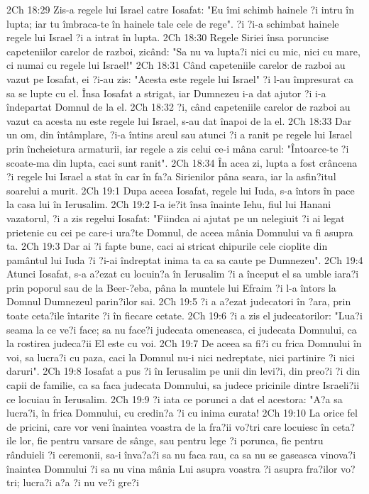 2Ch 18:29  Zis-a regele lui Israel catre Iosafat: "Eu îmi schimb hainele ?i intru în lupta; iar tu îmbraca-te în hainele tale cele de rege". ?i ?i-a schimbat hainele regele lui Israel ?i a intrat în lupta.
2Ch 18:30  Regele Siriei însa poruncise capeteniilor carelor de razboi, zicând: "Sa nu va lupta?i nici cu mic, nici cu mare, ci numai cu regele lui Israel!"
2Ch 18:31  Când capeteniile carelor de razboi au vazut pe Iosafat, ei ?i-au zis: "Acesta este regele lui Israel" ?i l-au împresurat ca sa se lupte cu el. Însa Iosafat a strigat, iar Dumnezeu i-a dat ajutor ?i i-a îndepartat Domnul de la el.
2Ch 18:32  ?i, când capeteniile carelor de razboi au vazut ca acesta nu este regele lui Israel, s-au dat înapoi de la el.
2Ch 18:33  Dar un om, din întâmplare, ?i-a întins arcul sau atunci ?i a ranit pe regele lui Israel prin încheietura armaturii, iar regele a zis celui ce-i mâna carul: "Întoarce-te ?i scoate-ma din lupta, caci sunt ranit".
2Ch 18:34  În acea zi, lupta a fost crâncena ?i regele lui Israel a stat în car în fa?a Sirienilor pâna seara, iar la asfin?itul soarelui a murit.
2Ch 19:1  Dupa aceea Iosafat, regele lui Iuda, s-a întors în pace la casa lui în Ierusalim.
2Ch 19:2  I-a ie?it însa înainte Iehu, fiul lui Hanani vazatorul, ?i a zis regelui Iosafat: "Fiindca ai ajutat pe un nelegiuit ?i ai legat prietenie cu cei pe care-i ura?te Domnul, de aceea mânia Domnului va fi asupra ta.
2Ch 19:3  Dar ai ?i fapte bune, caci ai stricat chipurile cele cioplite din pamântul lui Iuda ?i ?i-ai îndreptat inima ta ca sa caute pe Dumnezeu".
2Ch 19:4  Atunci Iosafat, s-a a?ezat cu locuin?a în Ierusalim ?i a început el sa umble iara?i prin poporul sau de la Beer-?eba, pâna la muntele lui Efraim ?i l-a întors la Domnul Dumnezeul parin?ilor sai.
2Ch 19:5  ?i a a?ezat judecatori în ?ara, prin toate ceta?ile întarite ?i în fiecare cetate.
2Ch 19:6  ?i a zis el judecatorilor: "Lua?i seama la ce ve?i face; sa nu face?i judecata omeneasca, ci judecata Domnului, ca la rostirea judeca?ii El este cu voi.
2Ch 19:7  De aceea sa fi?i cu frica Domnului în voi, sa lucra?i cu paza, caci la Domnul nu-i nici nedreptate, nici partinire ?i nici daruri".
2Ch 19:8  Iosafat a pus ?i în Ierusalim pe unii din levi?i, din preo?i ?i din capii de familie, ca sa faca judecata Domnului, sa judece pricinile dintre Israeli?ii ce locuiau în Ierusalim.
2Ch 19:9  ?i iata ce porunci a dat el acestora: "A?a sa lucra?i, în frica Domnului, cu credin?a ?i cu inima curata!
2Ch 19:10  La orice fel de pricini, care vor veni înaintea voastra de la fra?ii vo?tri care locuiesc în ceta?ile lor, fie pentru varsare de sânge, sau pentru lege ?i porunca, fie pentru rânduieli ?i ceremonii, sa-i înva?a?i sa nu faca rau, ca sa nu se gaseasca vinova?i înaintea Domnului ?i sa nu vina mânia Lui asupra voastra ?i asupra fra?ilor vo?tri; lucra?i a?a ?i nu ve?i gre?i
